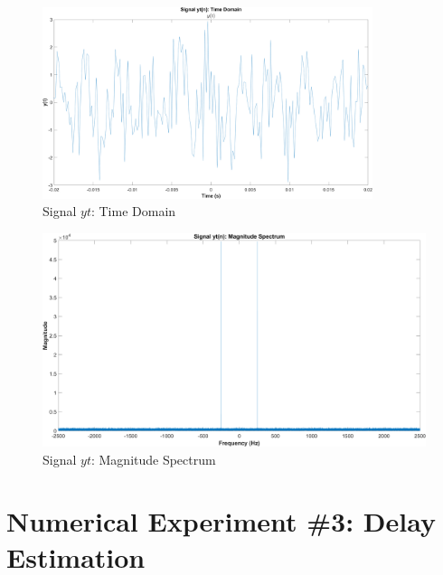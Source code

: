 \documentclass[12pt]{article}
\begin{document}
\begin{enumerate}[label=\roman*)]
	\begin{figure}[h]
		\centering
		\includegraphics[width=0.86\textwidth]{exp2_time}
		\caption{\label{fig:exp2_time}Signal $yt$: Time Domain}
	\end{figure}

	\clearpage

	\begin{figure}[h]
		\centering
		\includegraphics[width=\textwidth]{exp2_fft}
		\caption{\label{fig:exp2_fft}Signal $yt$: Magnitude Spectrum}
	\end{figure}
\end{enumerate}

\section*{Numerical Experiment \#3: Delay Estimation}

\end{document}
